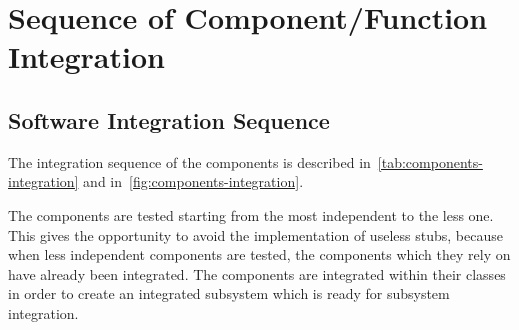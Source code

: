 \section{Sequence of Component/Function Integration}
\label{sec:sequence-integration}

\subsection{Software Integration Sequence}
The integration sequence of the components is described in~\autoref{tab:components-integration} and in~\autoref{fig:components-integration}.

The components are tested starting from the most independent to the less one. This gives the opportunity to avoid the implementation of useless stubs, because when less independent components are tested, the components which they rely on have already been integrated.
The components are integrated within their classes in order to create an integrated subsystem which is ready for subsystem integration.

